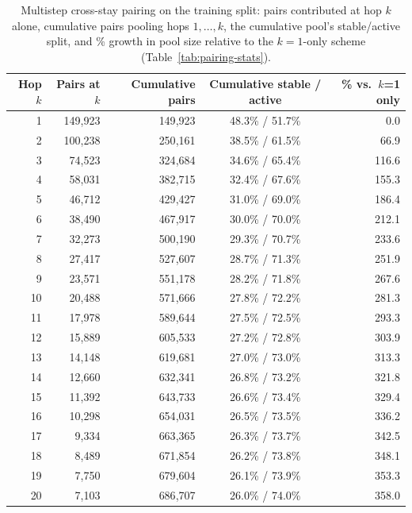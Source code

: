 \begin{table}[t]
\caption{Multistep cross-stay pairing on the training split: pairs contributed at hop $k$ alone, cumulative pairs pooling hops $1,\dots,k$, the cumulative pool's stable/active split, and \% growth in pool size relative to the $k=1$-only scheme (Table~\ref{tab:pairing-stats}).}
\label{tab:multistep-offsets}
\centering
\begin{tabular}{@{}r r r c r@{}}
\toprule
\textbf{Hop $k$} & \textbf{Pairs at $k$} & \textbf{Cumulative pairs} & \textbf{Cumulative stable / active} & \textbf{\% vs.\ $k$=1 only} \\
\midrule
1  & 149{,}923 & 149{,}923 & 48.3\% / 51.7\% &   0.0 \\
2  & 100{,}238 & 250{,}161 & 38.5\% / 61.5\% &  66.9 \\
3  &  74{,}523 & 324{,}684 & 34.6\% / 65.4\% & 116.6 \\
4  &  58{,}031 & 382{,}715 & 32.4\% / 67.6\% & 155.3 \\
5  &  46{,}712 & 429{,}427 & 31.0\% / 69.0\% & 186.4 \\
6  &  38{,}490 & 467{,}917 & 30.0\% / 70.0\% & 212.1 \\
7  &  32{,}273 & 500{,}190 & 29.3\% / 70.7\% & 233.6 \\
8  &  27{,}417 & 527{,}607 & 28.7\% / 71.3\% & 251.9 \\
9  &  23{,}571 & 551{,}178 & 28.2\% / 71.8\% & 267.6 \\
10 &  20{,}488 & 571{,}666 & 27.8\% / 72.2\% & 281.3 \\
11 &  17{,}978 & 589{,}644 & 27.5\% / 72.5\% & 293.3 \\
12 &  15{,}889 & 605{,}533 & 27.2\% / 72.8\% & 303.9 \\
13 &  14{,}148 & 619{,}681 & 27.0\% / 73.0\% & 313.3 \\
14 &  12{,}660 & 632{,}341 & 26.8\% / 73.2\% & 321.8 \\
15 &  11{,}392 & 643{,}733 & 26.6\% / 73.4\% & 329.4 \\
16 &  10{,}298 & 654{,}031 & 26.5\% / 73.5\% & 336.2 \\
17 &   9{,}334 & 663{,}365 & 26.3\% / 73.7\% & 342.5 \\
18 &   8{,}489 & 671{,}854 & 26.2\% / 73.8\% & 348.1 \\
19 &   7{,}750 & 679{,}604 & 26.1\% / 73.9\% & 353.3 \\
20 &   7{,}103 & 686{,}707 & 26.0\% / 74.0\% & 358.0 \\
\bottomrule
\end{tabular}
\end{table}

